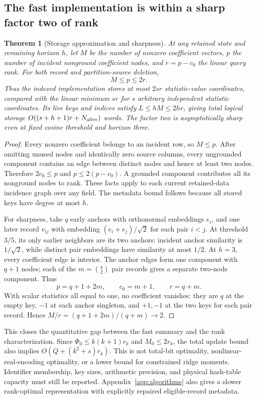 \documentclass[11pt,a4paper]{article}
\newtheorem{theorem}{Theorem}[section]
\theoremstyle{definition}\newtheorem{definition}[theorem]{Definition}
\begin{document}
\subsection{The fast implementation is within a sharp factor two of rank}
\begin{theorem}[Storage approximation and sharpness]\label{thm:twofactor}
At any retained state and remaining horizon $h$, let $M$ be the number of nonzero coefficient vectors, $p$ the number of incident nonground coefficient nodes, and $r=p-c_0$ the linear query rank. For both record and partition-source deletion,
\[
 M\le p\le2r.
\]
Thus the indexed implementation stores at most $2sr$ statistic-value coordinates, compared with the linear minimum $sr$ for $s$ arbitrary independent statistic coordinates. Its live keys and indices satisfy $L\le hM\le2hr$, giving total logical storage $O((s+h+1)r+N_{\rm alive})$ words. The factor two is asymptotically sharp even at fixed cosine threshold and horizon three.
\end{theorem}
\begin{proof}
Every nonzero coefficient belongs to an incident row, so $M\le p$. After omitting unused nodes and identically zero source columns, every ungrounded component contains an edge between distinct nodes and hence at least two nodes. Therefore $2c_0\le p$ and $p\le2(p-c_0)$. A grounded component contributes all its nonground nodes to rank. These facts apply to each current retained-data incidence graph over any field. The metadata bound follows because all stored keys have degree at most $h$.

For sharpness, take $q$ early anchors with orthonormal embeddings $e_i$, and one later record $v_{ij}$ with embedding $(e_i+e_j)/\sqrt2$ for each pair $i<j$. At threshold $3/5$, its only earlier neighbors are its two anchors: incident anchor similarity is $1/\sqrt2$, while distinct pair embeddings have similarity at most $1/2$. At $h=3$, every coefficient edge is interior. The anchor edges form one component with $q+1$ nodes; each of the $m=\binom q2$ pair records gives a separate two-node component. Thus
\[
 p=q+1+2m,\qquad c_0=m+1,\qquad r=q+m.
\]
With scalar statistics all equal to one, no coefficient vanishes: they are $q$ at the empty key, $-1$ at each anchor singleton, and $+1,-1$ at the two keys for each pair record. Hence $M/r=(q+1+2m)/(q+m)\to2$.
\end{proof}
This closes the quantitative gap between the fast summary and the rank characterization. Since $\Phi_0\le k(k+1)r_k$ and $M_0\le2r_k$, the total update bound also implies $O(Q+(k^2+s)r_k)$. This is not total-bit optimality, nonlinear-real-encoding optimality, or a lower bound for constrained ridge moments. Identifier membership, key sizes, arithmetic precision, and physical hash-table capacity must still be reported. Appendix~\ref{app:algorithms} also gives a slower rank-optimal representation with explicitly repaired eligible-record metadata.
\end{document}
